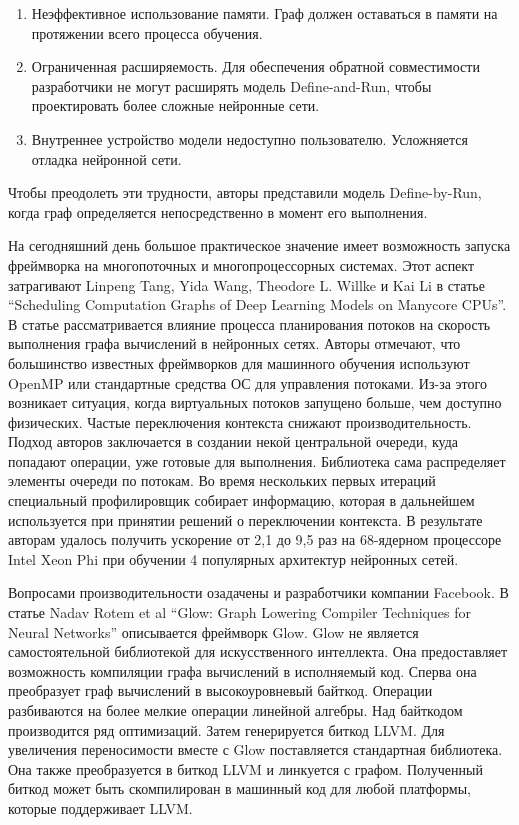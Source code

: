 \begin{enumerate}
	\item Неэффективное использование памяти. Граф должен оставаться в памяти на протяжении всего процесса обучения.
	\item Ограниченная расширяемость. Для обеспечения обратной совместимости разработчики не могут расширять модель Define-and-Run, чтобы проектировать более сложные нейронные сети.
	\item Внутреннее устройство модели недоступно пользователю. Усложняется отладка нейронной сети.
\end{enumerate}
Чтобы преодолеть эти трудности, авторы представили модель Define-by-Run, когда граф определяется непосредственно в момент его выполнения.
\par
На сегодняшний день большое практическое значение имеет возможность запуска фреймворка на многопоточных и многопроцессорных системах. Этот аспект затрагивают Linpeng Tang, Yida Wang, Theodore L. Willke и Kai Li в статье “Scheduling Computation Graphs of Deep Learning Models on Manycore CPUs”\cite{sched1}. В статье рассматривается влияние процесса планирования потоков на скорость выполнения графа вычислений в нейронных сетях. Авторы отмечают, что большинство известных фреймворков для машинного обучения используют OpenMP или стандартные средства ОС для управления потоками. Из-за этого возникает ситуация, когда виртуальных потоков запущено больше, чем доступно физических. Частые переключения контекста снижают производительность. Подход авторов заключается в создании некой центральной очереди, куда попадают операции, уже готовые для выполнения. Библиотека сама распределяет элементы очереди по потокам. Во время нескольких первых итераций специальный профилировщик собирает информацию, которая в дальнейшем используется при принятии решений о переключении контекста. В результате авторам удалось получить ускорение от 2,1 до 9,5 раз на 68-ядерном процессоре Intel Xeon Phi при обучении 4 популярных архитектур нейронных сетей.
\par
Вопросами производительности озадачены и разработчики компании Facebook. В статье Nadav Rotem et al “Glow: Graph Lowering Compiler Techniques for Neural Networks”\cite{glow} описывается фреймворк Glow. Glow не является самостоятельной библиотекой для искусственного интеллекта. Она предоставляет возможность компиляции графа вычислений в исполняемый код. Сперва она преобразует граф вычислений в высокоуровневый байткод. Операции разбиваются на более мелкие операции линейной алгебры. Над байткодом производится ряд оптимизаций. Затем генерируется биткод LLVM. Для увеличения переносимости вместе с Glow поставляется стандартная библиотека. Она также преобразуется в биткод LLVM и линкуется с графом. Полученный биткод может быть скомпилирован в машинный код для любой платформы, которые поддерживает LLVM.
